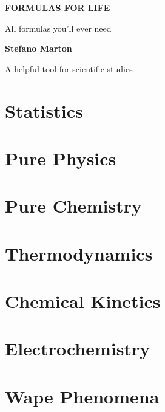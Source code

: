\documentclass[a4,11pt]{report}
\makeatletter
\renewcommand\tableofcontents{%
		 \begin{multicols}{2}[\section*{\contentsname
				     \@mkboth{%
						      \MakeUppercase\contentsname}{\MakeUppercase\contentsname}}]%
				   \@starttoc{toc}%
		 \end{multicols}%
}
\makeatother
\begin{document}
 \begin{titlepage}
		  \begin{center}
				   \vspace*{6cm}

				   \Huge
				   \textbf{FORMULAS FOR LIFE}

				   \vspace{0.5cm}
				   \LARGE
				   All formulas you'll ever need

				   \vspace{1.5cm}

				   \textbf{Stefano Marton}

				   \vfill

				   A helpful tool for scientific studies

				   \vspace{0.8cm}

		  \end{center}
 \end{titlepage}

 \tableofcontents

 \chapter{Statistics}
  

 \chapter{Pure Physics}
  

 \chapter{Pure Chemistry}
  

 \chapter{Thermodynamics}
  

 \chapter{Chemical Kinetics}
  

 \chapter{Electrochemistry}
  

 \chapter{Wape Phenomena}
  

 
\end{document}
